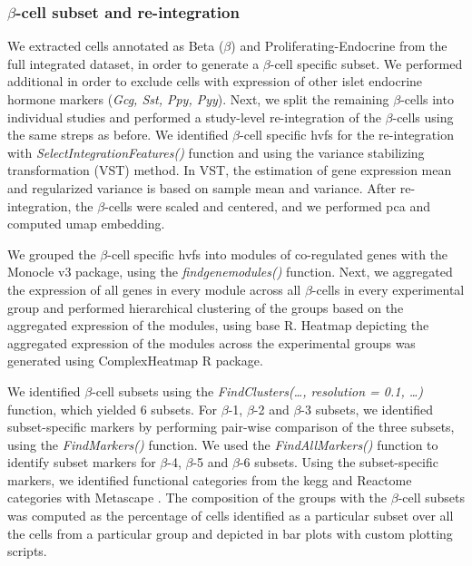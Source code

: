 \subsubsection{\large $\beta$-cell subset and re-integration}
\par We extracted cells annotated as Beta ($\beta$) and Proliferating-Endocrine from the full integrated dataset, in order to generate a $\beta$-cell specific subset. We performed additional  in order to exclude cells with  expression of other islet endocrine hormone markers (\textit{Gcg, Sst, Ppy, Pyy}). Next, we split the remaining $\beta$-cells into individual studies and performed a study-level re-integration of the $\beta$-cells using the same streps as before. We identified $\beta$-cell specific \glspl{hvf} for the re-integration with \textit{SelectIntegrationFeatures()} function and using the variance stabilizing transformation (VST) method. In VST, the estimation of gene expression mean and regularized variance is based on sample mean and variance. After re-integration, the $\beta$-cells were scaled and centered, and we performed \gls{pca} and computed \gls{umap} embedding.\\
\par We grouped the $\beta$-cell specific \glspl{hvf} into modules of co-regulated genes with the Monocle v3 package, using the \textit{find\textunderscore gene\textunderscore modules()} function. Next, we aggregated the expression of all genes in every module across all $\beta$-cells in every experimental group and performed hierarchical clustering of the groups based on the aggregated expression of the modules, using base R. Heatmap depicting the aggregated expression of the modules across the experimental groups was generated using ComplexHeatmap R package.\\

\par We identified $\beta$-cell subsets using the \textit{FindClusters(…, resolution = 0.1, …)} function, which yielded 6 subsets. For $\beta$-1, $\beta$-2 and $\beta$-3 subsets, we identified subset-specific markers by performing pair-wise comparison of the three subsets, using the \textit{FindMarkers()} function. We used the \textit{FindAllMarkers()} function to identify subset markers for $\beta$-4, $\beta$-5 and $\beta$-6 subsets. Using the subset-specific markers, we identified functional categories from the \gls{kegg} and Reactome categories with Metascape \textbf{\cite{zhou_metascape_2019}}. The composition of the groups with the $\beta$-cell subsets was computed as the percentage of cells identified as a particular subset over all the cells from a particular group and depicted in bar plots with custom plotting scripts.

